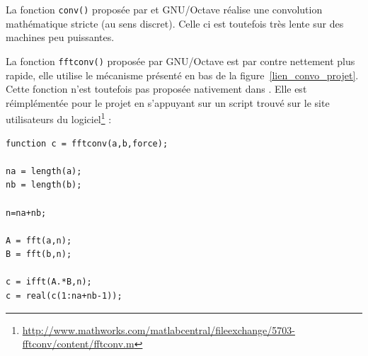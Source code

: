 La fonction \texttt{conv()} proposée par \matlab et GNU/Octave réalise une convolution mathématique stricte (au sens
discret). Celle ci est toutefois très lente sur des machines peu puissantes.

La fonction \texttt{fftconv()} proposée par GNU/Octave est par contre nettement plus rapide, elle utilise le mécanisme
présenté en bas de la figure~\ref{lien_convo_projet}. Cette fonction n'est toutefois pas proposée nativement dans
\matlab. Elle est réimplémentée pour le projet en s'appuyant sur un script trouvé sur le site utilisateurs du
logiciel\footnote{\url{http://www.mathworks.com/matlabcentral/fileexchange/5703-fftconv/content/fftconv.m}} :

\begin{Verbatim}[samepage=true]
function c = fftconv(a,b,force);

na = length(a);
nb = length(b);

n=na+nb;

A = fft(a,n);
B = fft(b,n);

c = ifft(A.*B,n);
c = real(c(1:na+nb-1));
\end{Verbatim}


